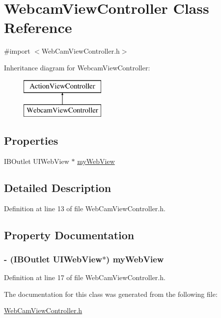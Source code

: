 \hypertarget{interface_webcam_view_controller}{
\section{WebcamViewController Class Reference}
\label{interface_webcam_view_controller}
}


{\ttfamily \#import $<$WebCamViewController.h$>$}

Inheritance diagram for WebcamViewController:\begin{figure}[H]
\begin{center}
\leavevmode
\includegraphics[height=2.000000cm]{interface_webcam_view_controller}
\end{center}
\end{figure}
\subsection*{Properties}
\begin{DoxyCompactItemize}
\item 
IBOutlet UIWebView $\ast$ \hyperlink{interface_webcam_view_controller_a9527d1e82d0094024e571c7e2e6ef741}{myWebView}
\end{DoxyCompactItemize}


\subsection{Detailed Description}


Definition at line 13 of file WebCamViewController.h.



\subsection{Property Documentation}
\hypertarget{interface_webcam_view_controller_a9527d1e82d0094024e571c7e2e6ef741}{
\subsubsection[{myWebView}]{\setlength{\rightskip}{0pt plus 5cm}-\/ (IBOutlet UIWebView$\ast$) myWebView}}
\label{interface_webcam_view_controller_a9527d1e82d0094024e571c7e2e6ef741}


Definition at line 17 of file WebCamViewController.h.



The documentation for this class was generated from the following file:\begin{DoxyCompactItemize}
\item 
\hyperlink{_web_cam_view_controller_8h}{WebCamViewController.h}\end{DoxyCompactItemize}

